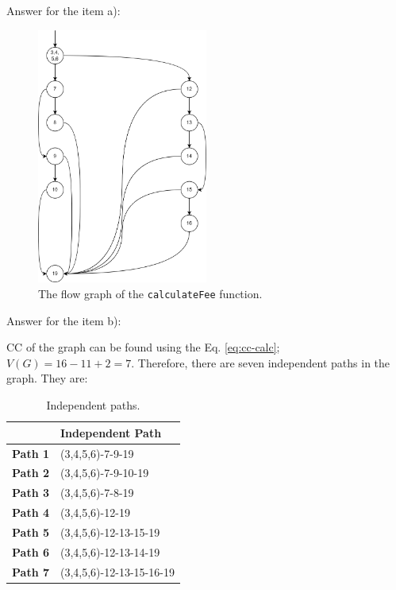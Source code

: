 \begin{solution}
    Answer for the item a):
    
    \begin{figure}[H]
        \centering
        \includegraphics[width=0.5\textwidth]{images/exercise-7a-solution.png}
        \caption{The flow graph of the \lstinline!calculateFee! function.}
        \label{fig:ex7-fg}
    \end{figure}
    
    Answer for the item b):
    
    CC of the graph can be found using the Eq. \ref{eq:cc-calc}; $V(G) = 16 - 11 + 2 = 7$. Therefore, there are seven independent paths in the graph. They are:
    \begin{table}[H]
        \centering
        \renewcommand{\arraystretch}{1.2}
        \caption{Independent paths.}
        \label{tab:ex7-indep-paths}
        \begin{tabularx}{\textwidth}{lX}
            \toprule
             & Independent Path\\
            \midrule
            \textbf{Path 1} & (3,4,5,6)-7-9-19\\
            \textbf{Path 2} & (3,4,5,6)-7-9-10-19\\
            \textbf{Path 3} & (3,4,5,6)-7-8-19\\
            \textbf{Path 4} & (3,4,5,6)-12-19\\
            \textbf{Path 5} & (3,4,5,6)-12-13-15-19\\
            \textbf{Path 6} & (3,4,5,6)-12-13-14-19\\
            \textbf{Path 7} & (3,4,5,6)-12-13-15-16-19\\
            \bottomrule
        \end{tabularx}
    \end{table}
    

\end{solution}
